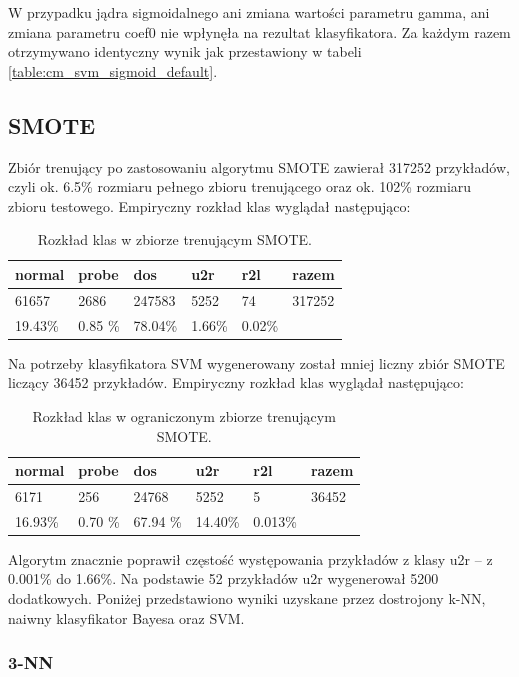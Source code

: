\documentclass[a4paper, 12pt]{article}
\begin{document}
W przypadku jądra sigmoidalnego ani zmiana wartości parametru gamma, ani zmiana parametru coef0 nie wpłynęła na rezultat klasyfikatora. Za każdym razem otrzymywano identyczny wynik jak przestawiony w tabeli \ref{table:cm_svm_sigmoid_default}.

\subsection{SMOTE}
\label{smote}

Zbiór trenujący po zastosowaniu algorytmu SMOTE zawierał 317252 przykładów, 
czyli ok. 6.5\% rozmiaru pełnego zbioru trenującego oraz ok. 102\% rozmiaru
zbioru testowego. Empiryczny rozkład klas wyglądał następująco:

\begin{table}[H]
\centering
	\begin{tabular}{ | l | l | l | l | l | l | } \hline
		normal & probe & dos & u2r & r2l & razem \\ \hline
		61657 & 2686 & 247583 & 5252 & 74 & 317252 \\ \hline
		19.43\% & 0.85 \% & 78.04\% & 1.66\%  & 0.02\% & \\ \hline
	\end{tabular}
\caption{Rozkład klas w zbiorze trenującym SMOTE.}
\label{table:train_smote_full}
\end{table}

Na potrzeby klasyfikatora SVM wygenerowany został mniej liczny zbiór SMOTE liczący 36452 przykładów. Empiryczny rozkład klas wyglądał następująco:
\begin{table}[H]
\centering
	\begin{tabular}{ | l | l | l | l | l | l | } \hline
		normal & probe & dos & u2r & r2l & razem \\ \hline
		6171 & 256 & 24768 & 5252 & 5 & 36452 \\ \hline
		16.93\% & 0.70 \% & 67.94 \% & 14.40\%  & 0.013\% & \\ \hline
	\end{tabular}
\caption{Rozkład klas w ograniczonym zbiorze trenującym SMOTE.}
\label{table:train_smote_small}
\end{table}

Algorytm znacznie poprawił częstość występowania przykładów z klasy u2r -- z 0.001\% do 1.66\%.
Na podstawie 52 przykładów u2r wygenerował 5200 dodatkowych.
Poniżej przedstawiono wyniki uzyskane przez dostrojony k-NN, naiwny klasyfikator Bayesa oraz SVM. 

\subsubsection{3-NN}
\end{document}
